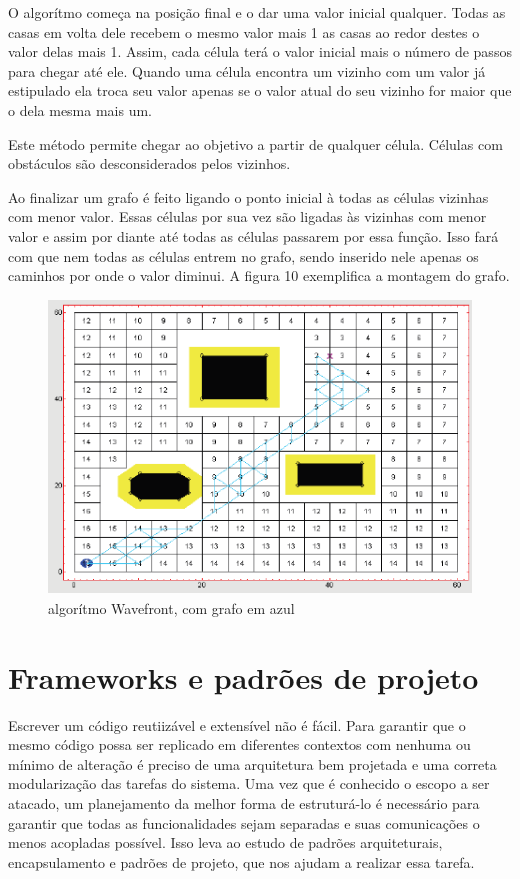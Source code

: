 O algorítmo começa na posição final e o dar uma valor inicial qualquer. Todas as casas em volta dele recebem o mesmo valor mais 1 as casas ao redor destes o valor delas mais 1. Assim, cada célula terá o valor inicial mais o número de passos para chegar até ele. Quando uma célula encontra um vizinho com um valor já estipulado ela troca seu valor apenas se o valor atual do seu vizinho for maior que o dela mesma mais um.

Este método permite chegar ao objetivo a partir de qualquer célula. Células com obstáculos são desconsiderados pelos vizinhos. 

Ao finalizar um grafo é feito ligando o ponto inicial à todas as células vizinhas com menor valor. Essas células por sua vez são ligadas às vizinhas com menor valor e assim por diante até todas as células passarem por essa função. Isso fará com que nem todas as células entrem no grafo, sendo inserido nele apenas os caminhos por onde o valor diminui. A figura 10 exemplifica a montagem do grafo.

\begin{figure}[h]
	\centering
	\label{fig10}
		\includegraphics[keepaspectratio=true,scale=0.5]{figuras/10wavefront.png}
	\caption{algorítmo Wavefront, com grafo em azul \cite{MRIT_SITE}}
\end{figure}

\section{Frameworks e padrões de projeto}

Escrever um código reutiizável e extensível não é fácil. Para garantir que o mesmo código possa ser replicado em diferentes contextos com nenhuma ou mínimo de alteração é preciso de uma arquitetura bem projetada e uma correta modularização das tarefas do sistema. Uma vez que é conhecido o escopo a ser atacado, um planejamento da melhor forma de estruturá-lo é necessário para garantir que todas as funcionalidades sejam separadas e suas comunicações o menos acopladas possível. Isso leva ao estudo de padrões arquiteturais, encapsulamento e padrões de projeto, que nos ajudam a realizar essa tarefa.

